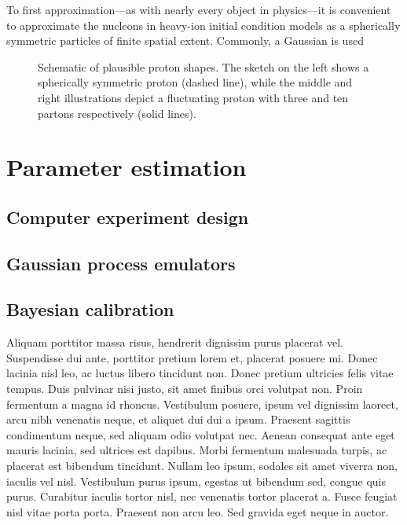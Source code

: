 \documentclass[aps,prc,reprint,amsmath,nofootinbib]{revtex4-1}
\begin{document}
To first approximation---as with nearly every object in physics---it is convenient to approximate the nucleons in heavy-ion initial condition models as a spherically symmetric particles of finite spatial extent. 
Commonly, a Gaussian is used 
\begin{figure}
  \caption{\label{proton_shapes} Schematic of plausible proton shapes.
  The sketch on the left shows a spherically symmetric proton (dashed line), while the middle and right illustrations depict a fluctuating proton with three and ten partons respectively (solid lines).
  }
\end{figure}

\section{Parameter estimation}

\subsection{Computer experiment design}

\subsection{Gaussian process emulators}

\subsection{Bayesian calibration}

Aliquam porttitor massa risus, hendrerit dignissim purus placerat vel. Suspendisse dui ante, porttitor pretium lorem et, placerat posuere mi. Donec lacinia nisl leo, ac luctus libero tincidunt non. Donec pretium ultricies felis vitae tempus. Duis pulvinar nisi justo, sit amet finibus orci volutpat non. Proin fermentum a magna id rhoncus. Vestibulum posuere, ipsum vel dignissim laoreet, arcu nibh venenatis neque, et aliquet dui dui a ipsum. Praesent sagittis condimentum neque, sed aliquam odio volutpat nec. Aenean consequat ante eget mauris lacinia, sed ultrices est dapibus. Morbi fermentum malesuada turpis, ac placerat est bibendum tincidunt. Nullam leo ipsum, sodales sit amet viverra non, iaculis vel nisl. Vestibulum purus ipsum, egestas ut bibendum sed, congue quis purus. Curabitur iaculis tortor nisl, nec venenatis tortor placerat a. Fusce feugiat nisl vitae porta porta. Praesent non arcu leo. Sed gravida eget neque in auctor.
\end{document}
